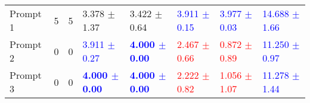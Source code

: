 \begin{table}
\begin{tabular}{lrrlllll}
Prompt 1 & 5 & 5 & 3.378 $\pm$ 1.37 & 3.422 $\pm$ 0.64 & \textcolor{blue}{3.911 $\pm$ 0.15} & \textcolor{blue}{3.977 $\pm$ 0.03} & \textcolor{blue}{14.688 $\pm$ 1.66} \\
Prompt 2 & 0 & 0 & \textcolor{blue}{3.911 $\pm$ 0.27} & \textbf{\textcolor{blue}{4.000 $\pm$ 0.00}} & \textcolor{red}{2.467 $\pm$ 0.66} & \textcolor{red}{0.872 $\pm$ 0.89} & \textcolor{blue}{11.250 $\pm$ 0.97} \\
Prompt 3 & 0 & 0 & \textbf{\textcolor{blue}{4.000 $\pm$ 0.00}} & \textbf{\textcolor{blue}{4.000 $\pm$ 0.00}} & \textcolor{red}{2.222 $\pm$ 0.82} & \textcolor{red}{1.056 $\pm$ 1.07} & \textcolor{blue}{11.278 $\pm$ 1.44} \\
\bottomrule
\end{tabular}
\end{table}
